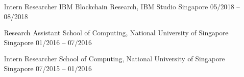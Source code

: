 

\begin{cventries}

  
  \cventryy
    {Intern Researcher} %
    {IBM Blockchain Research, IBM Studio} %
    {Singapore} %
    {05/2018 -- 08/2018} %
    {
    }



  \cventryy
    {Research Assistant} %
    {School of Computing, National University of Singapore} %
    {Singapore} %
    {01/2016 -- 07/2016} %
    {
    }



  \cventryy
    {Intern Researcher} %
    {School of Computing, National University of Singapore} %
    {Singapore} %
    {07/2015 -- 01/2016} %
    {
    }


\end{cventries}
